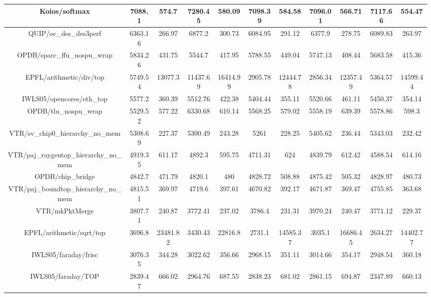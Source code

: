 {\begin{longtable}{|*{11}{c|}}
        \hline
        Koios/softmax & 7088.1 & 574.7 & 7280.45 & 580.09 & 7098.39 & 584.58 & 7096.01 & 566.71 & 7117.66 & 554.47 \\
        \hline
        QUIP/oc\_des\_des3perf & 6363.16 & 266.97 & 6877.2 & 300.73 & 6084.95 & 291.12 & 6377.9 & 278.75 & 6089.83 & 263.97 \\
        \hline
        OPDB/sparc\_ffu\_nospu\_wrap & 5834.26 & 431.75 & 5544.7 & 417.95 & 5788.55 & 449.04 & 5747.13 & 408.44 & 5683.58 & 415.36 \\
        \hline
        EPFL/arithmetic/div/top & 5749.54 & 13077.3 & 11437.69 & 16414.99 & 2905.78 & 12444.78 & 2856.34 & 12357.49 & 5364.57 & 14599.44 \\
        \hline
        IWLS05/opencores/eth\_top & 5577.2 & 360.39 & 5512.76 & 422.38 & 5404.44 & 355.11 & 5520.66 & 461.11 & 5450.37 & 354.14 \\
        \hline
        OPDB/tlu\_nospu\_wrap & 5529.52 & 577.22 & 6330.68 & 610.14 & 5568.25 & 579.02 & 5558.19 & 639.39 & 5578.86 & 598.3 \\
        \hline
        VTR/sv\_chip0\_hierarchy\_no\_mem & 5308.69 & 227.37 & 5300.49 & 243.28 & 5261 & 228.25 & 5405.62 & 236.44 & 5343.03 & 232.42 \\
        \hline
        VTR/paj\_raygentop\_hierarchy\_no\_mem & 4919.35 & 611.17 & 4892.3 & 595.75 & 4711.31 & 624 & 4839.79 & 612.42 & 4588.54 & 614.16 \\
        \hline
        OPDB/chip\_bridge & 4842.7 & 471.79 & 4820.1 & 480 & 4828.72 & 508.88 & 4875.42 & 505.32 & 4828.97 & 480.73 \\
        \hline
        VTR/paj\_boundtop\_hierarchy\_no\_mem & 4815.51 & 369.97 & 4719.6 & 397.61 & 4670.82 & 392.17 & 4671.87 & 369.47 & 4755.85 & 363.68 \\
        \hline
        VTR/mkPktMerge & 3807.71 & 240.87 & 3772.41 & 237.02 & 3786.4 & 231.31 & 3970.24 & 240.47 & 3771.12 & 229.37 \\
        \hline
        EPFL/arithmetic/sqrt/top & 3696.8 & 23481.82 & 3430.43 & 22816.8 & 2731.1 & 14585.37 & 3035.1 & 16686.45 & 2634.27 & 14402.77 \\
        \hline
        IWLS05/faraday/frisc & 3076.35 & 344.28 & 3022.62 & 356.66 & 2968.15 & 351.11 & 3014.66 & 354.17 & 2948.54 & 360.18 \\
        \hline
        IWLS05/faraday/TOP & 2839.47 & 666.02 & 2964.76 & 687.55 & 2838.23 & 681.02 & 2861.15 & 694.87 & 2347.89 & 660.13 \\
        \hline

\end{longtable}}
